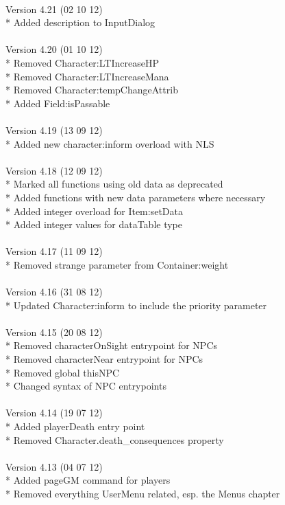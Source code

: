 \documentclass[a4paper,10pt,makeidx]{scrreprt}
\begin{document}
\\
Version 4.21 (02 10 12)\\
* Added description to InputDialog\\
\\
Version 4.20 (01 10 12)\\
* Removed Character:LTIncreaseHP\\
* Removed Character:LTIncreaseMana\\
* Removed Character:tempChangeAttrib\\
* Added Field:isPassable\\
\\
Version 4.19 (13 09 12)\\
* Added new character:inform overload with NLS\\
\\
Version 4.18 (12 09 12)\\
* Marked all functions using old data as deprecated\\
* Added functions with new data parameters where necessary\\
* Added integer overload for Item:setData\\
* Added integer values for dataTable type\\
\\
Version 4.17 (11 09 12)\\
* Removed strange parameter from Container:weight\\
\\
Version 4.16 (31 08 12)\\
* Updated Character:inform to include the priority parameter\\
\\
Version 4.15 (20 08 12)\\
* Removed characterOnSight entrypoint for NPCs\\
* Removed characterNear entrypoint for NPCs\\
* Removed global thisNPC\\
* Changed syntax of NPC entrypoints\\
\\
Version 4.14 (19 07 12)\\
* Added playerDeath entry point\\
* Removed Character.death\_consequences property\\ 
\\
Version 4.13 (04 07 12)\\
* Added pageGM command for players\\
* Removed everything UserMenu related, esp. the Menus chapter\\
\end{document}
